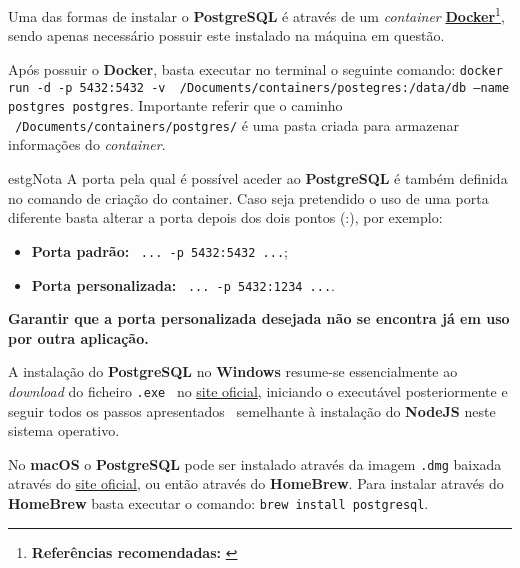 \label{postgreSQLAttachments}


Uma das formas de instalar o \textbf{PostgreSQL} é através de um \textit{container} \textbf{\href{https://www.docker.com/}{Docker}}\footnote{\textbf{Referências recomendadas:} \cite{postgresDocker,postgresContainer}}, sendo apenas necessário possuir este instalado na máquina em questão.

Após possuir o \textbf{Docker}, basta executar no terminal o seguinte comando: \texttt{docker run -d -p 5432:5432 -v ~/Documents/containers/postegres:/data/db --name postgres postgres}. Importante referir que o caminho \texttt{~/Documents/containers/postgres/} é uma pasta criada para armazenar informações do \textit{container}.

\begin{mybox}{estg}{Nota}
	A porta pela qual é possível aceder ao \textbf{PostgreSQL} é também definida no comando de criação do container. Caso seja pretendido o uso de uma porta diferente basta alterar a porta depois dos dois pontos (:), por exemplo:

	\begin{itemize}
		\item \textbf{Porta padrão:} ~\texttt{... -p 5432:5432 ...};
		\item \textbf{Porta personalizada:} ~\texttt{... -p 5432:1234 ...}.
	\end{itemize}

	\hspace{15pt}

	\textbf{Garantir que a porta personalizada desejada não se encontra já em uso por outra aplicação.}
\end{mybox}


A instalação do \textbf{PostgreSQL} no \textbf{Windows} resume-se essencialmente ao \textit{download} do ficheiro \verb|.exe|~ no \href{https://www.postgresql.org/download/}{site oficial}, iniciando o executável posteriormente e seguir todos os passos apresentados {\small~semelhante à instalação do \textbf{NodeJS} neste sistema operativo}.


No \textbf{macOS} o \textbf{PostgreSQL} pode ser instalado através da imagem \verb|.dmg| baixada através do \href{https://www.postgresql.org/download/}{site oficial}, ou então através do \textbf{HomeBrew}. Para instalar através do \textbf{HomeBrew} basta executar o comando: \verb|brew install postgresql|.

